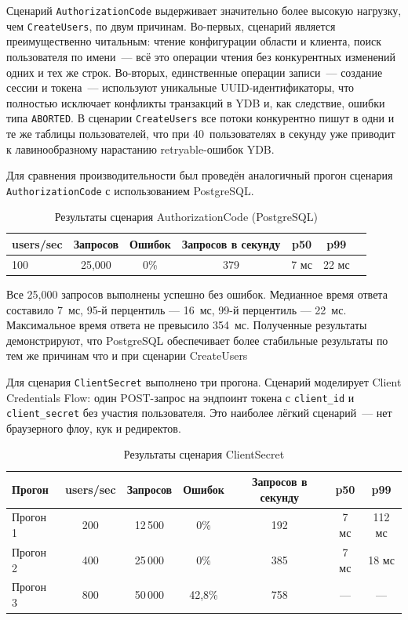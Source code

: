 \documentclass[times]{itmo-student-thesis}
\begin{document}
Сценарий \texttt{AuthorizationCode} выдерживает значительно более высокую
нагрузку, чем \texttt{CreateUsers}, по двум причинам.
Во-первых, сценарий является преимущественно читальным: чтение конфигурации
области и клиента, поиск пользователя по имени~--- всё это операции чтения
без конкурентных изменений одних и тех же строк.
Во-вторых, единственные операции записи~--- создание сессии и токена~---
используют уникальные UUID-идентификаторы, что полностью исключает конфликты
транзакций в YDB и, как следствие, ошибки типа \texttt{ABORTED}.
В сценарии \texttt{CreateUsers} все потоки конкурентно пишут в одни и те же
таблицы пользователей, что при 40~пользователях в секунду уже приводит
к лавинообразному нарастанию retryable-ошибок YDB.

Для сравнения производительности был проведён аналогичный прогон сценария \texttt{AuthorizationCode} с использованием PostgreSQL.
\begin{table}[H]
\centering
\begin{tabular}{|l|c|c|c|c|c|c|}
\hline
\textbf{users/sec} & \textbf{Запросов} & \textbf{Ошибок} & \textbf{Запросов в секунду} & \textbf{p50} & \textbf{p99} \\
\hline
100 & 25,000 & 0\% & 379 & 7 мс & 22 мс \\
\hline
\end{tabular}
\caption{Результаты сценария AuthorizationCode (PostgreSQL)}
\label{tab:load-auth-code-postgres}
\end{table}

Все 25,000 запросов выполнены успешно без ошибок.
Медианное время ответа составило 7~мс, 95-й перцентиль — 16~мс, 99-й перцентиль — 22~мс.
Максимальное время ответа не превысило 354~мс.
Полученные результаты демонстрируют, что PostgreSQL обеспечивает более стабильные результаты
по тем же причинам что и при сценарии CreateUsers

Для сценария \texttt{ClientSecret} выполнено три прогона.
Сценарий моделирует Client Credentials Flow: один POST-запрос на эндпоинт
токена с \texttt{client\_id} и \texttt{client\_secret} без участия пользователя.
Это наиболее лёгкий сценарий~--- нет браузерного флоу, кук и редиректов.

\begin{table}[H]
\centering
\begin{tabular}{|l|c|c|c|c|c|c|}
\hline
\textbf{Прогон} & \textbf{users/sec} & \textbf{Запросов} & \textbf{Ошибок} & \textbf{Запросов в секунду} & \textbf{p50} & \textbf{p99} \\
\hline
Прогон 1  & 200 & 12\,500 & 0\%     & 192  & 7 мс   & 112 мс \\
Прогон 2  & 400 & 25\,000 & 0\%     & 385  & 7 мс   & 18 мс \\
Прогон 3  & 800 & 50\,000 & 42{,}8\% & 758  & ---    & --- \\
\hline
\end{tabular}
\caption{Результаты сценария ClientSecret}
\label{tab:load-client-secret}
\end{table}
\end{document}

